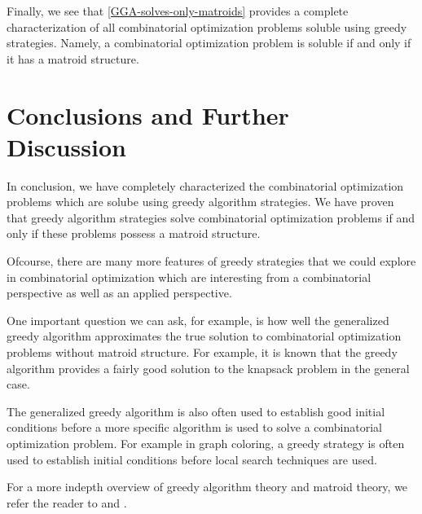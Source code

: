 \documentclass[a4paper,11pt]{report}
\theoremstyle{plain}
\theoremstyle{definition}
\begin{document}
Finally, we see that \autoref{GGA-solves-only-matroids} provides a complete
characterization of all combinatorial optimization problems soluble using
greedy strategies. Namely, a combinatorial optimization problem is soluble
if and only if it has a matroid structure.




\section{Conclusions and Further Discussion}

In conclusion, we have completely characterized the combinatorial optimization
problems which are solube using greedy algorithm strategies. We have proven
that greedy algorithm strategies solve combinatorial optimization problems if
and only if these problems possess a matroid structure.

Ofcourse, there are many more features of greedy strategies that we could explore
in combinatorial optimization which are interesting from a combinatorial
perspective as well as an applied perspective.

One important question we can ask, for example, is how well the generalized
greedy algorithm approximates the true solution to combinatorial optimization
problems without matroid structure. For example, it is known that the greedy
algorithm provides a fairly good solution to the knapsack problem in the general
case.

The generalized greedy algorithm is also often used to establish good initial
conditions before a more specific algorithm is used to solve a combinatorial
optimization problem. For example in graph coloring, a greedy strategy is often
used to establish initial conditions before local search techniques are used.

For a more indepth overview of greedy algorithm theory and matroid theory,
we refer the reader to \cite{clrs} and \cite{matroid-theory}.

\clearpage


\end{document}
